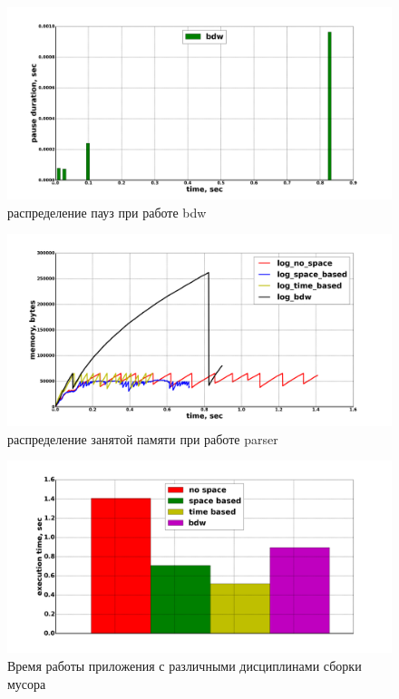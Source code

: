 \begin{figure}[ph]
\caption{\label{pic:pause-bdw}распределение пауз при работе bdw}
\includegraphics[width=1\linewidth]{Bakradze/bdw.png}
\end{figure}

\begin{figure}[ph]
\caption{\label{pic:allocated}распределение занятой памяти при работе parser}
\includegraphics[width=1\linewidth]{Bakradze/all-allocated.png}
\end{figure}

\begin{figure}[ph]
\caption{\label{pic:perf}Время работы приложения с различными дисциплинами сборки мусора}
\includegraphics[width=1\linewidth]{Bakradze/perf.png}
\end{figure}

